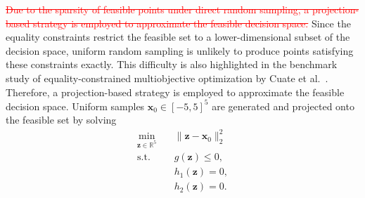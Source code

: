 \documentclass[11pt,pdflatex,sn-mathphys-ay]{sn-jnl}%
\theoremstyle{definition}
\theoremstyle{thmstyleone}%
\theoremstyle{thmstyletwo}%
\theoremstyle{thmstylethree}%
\newcommand{\del}[1]{\textcolor{red}{\sout{#1}}}
\newcommand{\add}[1]{\textcolor{revisionblue}{#1}}
\begin{document}
	\del{Due to the sparsity of feasible points under direct random
		sampling, a projection-based strategy is employed to
		approximate the feasible decision space.}
	\add{Since the equality constraints restrict the feasible
		set to a lower-dimensional subset of the decision space,
		uniform random sampling is unlikely to produce points
		satisfying these constraints exactly. \add{This difficulty is also highlighted
			in the benchmark study of equality-constrained multiobjective
			optimization by Cuate et al.~\cite{cuate2020benchmark}.} Therefore, a
		projection-based strategy is employed to approximate
		the feasible decision space.}
	Uniform samples $\bm{x}_0 \in [-5,5]^5$ are generated and projected onto the feasible set by solving
	\begin{equation}
		\label{eq:projection-problem}
		\begin{aligned}
			\min_{\bm{z} \in \mathbb{R}^5} \quad & \|\bm{z} - \bm{x}_0\|_2^2 \\
			\text{s.t.} \quad & g(\bm{z}) \le 0, \\
			& h_1(\bm{z}) = 0, \\
			& h_2(\bm{z}) = 0 .
		\end{aligned}
	\end{equation}
	
\end{document}

